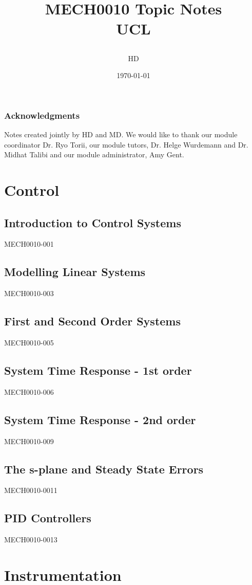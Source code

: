 \documentclass[12pt,a4paper, twoside]{report}
\begin{document}
\title{
  {MECH0010 Topic Notes}\\
  {\large UCL}
  \author{HD}
  \date{\today}
}
\maketitle
\section*{Acknowledgments}
Notes created jointly by HD and MD. We would like to thank our module coordinator Dr. Ryo Torii, our module tutors, Dr. Helge Wurdemann and Dr. Midhat Talibi and our module administrator, Amy Gent.
\tableofcontents
\part{Control}
\chapter{Introduction to Control Systems}
{MECH0010-001}
\chapter{Modelling Linear Systems}
{MECH0010-003}
\chapter{First and Second Order Systems}
{MECH0010-005}
\chapter{System Time Response - 1st order}
{MECH0010-006}
\chapter{System Time Response - 2nd order}
{MECH0010-009}
\chapter{The s-plane and Steady State Errors}
{MECH0010-0011}
\chapter{PID Controllers}
{MECH0010-0013}

\part{Instrumentation}
\end{document}
